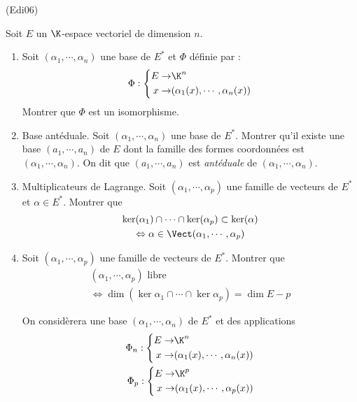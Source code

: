 \begin{tiny}(Edi06)\end{tiny}
Soit $E$ un $\K$-espace vectoriel de dimension $n$.
\begin{enumerate}
\item Soit $(\alpha_1,\cdots,\alpha_n)$ une base de $E^*$ et $\Phi$ définie par :
\begin{displaymath}
 \Phi :\left\lbrace 
\begin{aligned}
 E \rightarrow& \K^n \\
 x \rightarrow& (\alpha_1(x),\cdots,\alpha_n(x))
\end{aligned}
\right. 
\end{displaymath}
Montrer que $\Phi$ est un isomorphisme.

\item Base antéduale.\newline
Soit $(\alpha_1,\cdots,\alpha_n)$ une base de $E^*$. Montrer qu'il existe une base $(a_1,\cdots,a_n)$ de $E$ dont la famille des formes coordonnées est $(\alpha_1,\cdots,\alpha_n)$. On dit que $(a_1,\cdots,a_n)$ est \emph{antéduale} de $(\alpha_1,\cdots,\alpha_n)$.

\item Multiplicateurs de Lagrange.\newline
Soit $(\alpha_1,\cdots,\alpha_p)$ une famille de vecteurs de $E^*$ et $\alpha\in E^*$. Montrer que
\begin{multline*}
  \ker(\alpha_1) \cap \cdots \cap \ker(\alpha_p) \subset \ker(\alpha) \\
  \Leftrightarrow
  \alpha \in \Vect(\alpha_1,\cdots, \alpha_p)
\end{multline*}

\item Soit $(\alpha_1,\cdots,\alpha_p)$ une famille de vecteurs de $E^*$. Montrer que  
\begin{multline*}
(\alpha_1,\cdots,\alpha_p) \text{ libre } \\
\Leftrightarrow
 \dim(\ker \alpha_1\cap\cdots\cap\ker\alpha_p) = \dim E -p
\end{multline*}

On considèrera une base $(\alpha_1,\cdots,\alpha_n)$ de $E^*$ et des applications
\begin{align*}
 \Phi_n :\left\lbrace 
\begin{aligned}
 E \rightarrow& \K^n \\
 x \rightarrow& (\alpha_1(x),\cdots,\alpha_n(x))
\end{aligned}
\right. \\
 \Phi_p :\left\lbrace 
\begin{aligned}
 E \rightarrow& \K^p \\
 x \rightarrow& (\alpha_1(x),\cdots,\alpha_p(x))
\end{aligned}
\right. 
\end{align*}

\end{enumerate}
